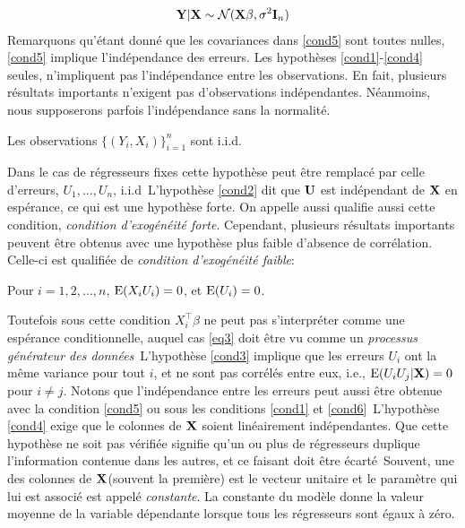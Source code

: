 \begin{align*}
\mathbf Y|\mathbf X \sim\mathcal{N}(\mathbf X\beta, \sigma^2\mathbf{I}_n)
\end{align*}
Remarquons qu'étant donné que les covariances dans \eqref{cond5} sont toutes nulles, 
 \eqref{cond5} implique l'indépendance des erreurs. Les hypothèses \eqref{cond1}-\eqref{cond4} seules, 
 n'impliquent pas l'indépendance entre les observations. En fait, plusieurs résultats importants n'exigent pas 
 d'observations indépendantes. Néanmoins, nous supposerons parfois l'indépendance  sans la normalité.
\begin{condition}
Les observations $\{(Y_i, X_i)\}_{i=1}^n$ sont i.i.d.
\label{cond6}
\end{condition}
Dans le cas de régresseurs fixes cette hypothèse peut être remplacé par celle d'erreurs, $U_1, ..., U_n$, i.i.d\
L'hypothèse \eqref{cond2} dit que $\mathbf U$ est indépendant de $\mathbf X$ en espérance, ce qui est une hypothèse forte. On appelle aussi
qualifie aussi cette condition, \emph{condition d'exogénéité forte}. Cependant, plusieurs résultats importants peuvent être obtenus avec
 une hypothèse plus faible  d'absence de corrélation. Celle-ci est qualifiée de \emph{condition d'exogénéité faible}:
\begin{condition}
Pour $i=1,2,...,n$, $\operatorname{E}(X_iU_i)=0$, et $\operatorname{E}(U_i)=0$.
\label{cond7}
\end{condition}
Toutefois sous cette condition $X_i^\top\beta$ ne peut pas s'interpréter comme une espérance conditionnelle, auquel cas \eqref{eq3} doit être vu comme un \emph{processus générateur des données}\
L'hypothèse \eqref{cond3} implique que les erreurs $U_i$ ont la même variance pour tout $i$, et ne sont pas corrélés entre eux, i.e., $\operatorname{E}(U_iU_j| \mathbf X) = 0$ pour $i\neq j$. Notons que l'indépendance entre les erreurs peut aussi être obtenue avec la condition \eqref{cond5} ou sous les  conditions \eqref{cond1} et \eqref{cond6}\
L'hypothèse \eqref{cond4} exige que le colonnes de $\mathbf X$ soient linéairement indépendantes. Que cette hypothèse ne soit pas vérifiée signifie qu'un ou plus de régresseurs duplique l'information contenue dans les autres, et ce faisant doit être écarté\
Souvent, une des colonnes de $\mathbf X$(souvent la première) est le vecteur unitaire et le paramètre qui lui est associé est appelé \emph{constante}. La constante du modèle donne la valeur moyenne de la variable dépendante lorsque tous les régresseurs sont égaux à zéro.

